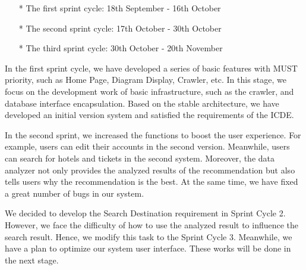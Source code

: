 \documentclass[conference]{IEEEtran}
\begin{document}
\begin{itemize}
\item[*] The first sprint cycle: 18th September - 16th October
\item[*] The second sprint cycle: 17th October - 30th October
\item[*] The third sprint cycle: 30th October - 20th November
\end{itemize}

In the first sprint cycle, we have developed a series of basic features with MUST priority, such as Home Page, Diagram Display, Crawler, etc. In this stage, we focus on the development work of basic infrastructure, such as the crawler, and database interface encapsulation. Based on the stable architecture, we have developed an initial version system and satisfied the requirements of the ICDE.

In the second sprint, we increased the functions to boost the user experience. For example, users can edit their accounts in the second version. Meanwhile, users can search for hotels and tickets in the second system. Moreover, the data analyzer not only provides the analyzed results of the recommendation but also tells users why the recommendation is the best. At the same time, we have fixed a great number of bugs in our system.

We decided to develop the Search Destination requirement in Sprint Cycle 2. However, we face the difficulty of how to use the analyzed result to influence the search result. Hence, we modify this task to the Sprint Cycle 3. Meanwhile, we have a plan to optimize our system user interface. These works will be done in the next stage.
\end{document}
